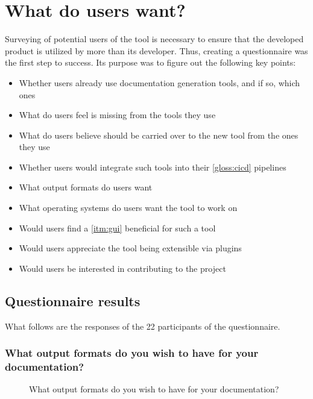 \section{What do users want?}
Surveying of potential users of the tool is necessary to ensure that the developed product is utilized by more than its developer.
Thus, creating a questionnaire was the first step to success. Its purpose was to figure out the following key points:
\begin{itemize}
    \item Whether users already use documentation generation tools, and if so, which ones
    \item What do users feel is missing from the tools they use
    \item What do users believe should be carried over to the new tool from the ones they use
    \item Whether users would integrate such tools into their \ref{gloss:cicd} pipelines
    \item What output formats do users want
    \item What operating systems do users want the tool to work on
    \item Would users find a \ref{itm:gui} beneficial for such a tool
    \item Would users appreciate the tool being extensible via plugins
    \item Would users be interested in contributing to the project
\end{itemize}

\subsection{Questionnaire results}

What follows are the responses of the 22 participants of the questionnaire.

\subsubsection*{What output formats do you wish to have for your documentation?}

\begin{figure}[H]
    \centering
    \caption{What output formats do you wish to have for your documentation?}
\end{figure}

